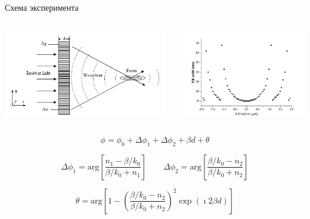 \documentclass[9pt, compress, xcolor=table]{beamer}
\begin{document}
\begin{frame}{Схема эксперимента}
\begin{columns}[c]
\column{6.5cm}
\begin{center}
\includegraphics[width=\textwidth]{ns2}
\end{center}
\column{6.5cm}
\begin{center}
\includegraphics[width=\textwidth]{ns3}
\end{center}
\end{columns}

\begin{equation*}
\phi=\phi_0+\Delta\phi_1+\Delta\phi_2+\beta d+\theta
\end{equation*}

\begin{equation*}
\Delta\phi_1=\text{arg}\left[\frac{n_1-\beta/k_0}{\beta/k_0+n_1}\right]\qquad\Delta\phi_2=\text{arg}\left[\frac{\beta/k_0-n_2}{\beta/k_0+n_2}\right] 
\end{equation*}

\begin{equation*}
\theta=\text{arg}\left[1-\left(\frac{\beta/k_0-n_2}{\beta/k_0+n_2}\right)^2\exp(\imath 2 \beta d)\right] 
\end{equation*}

\end{frame}
\end{document}
